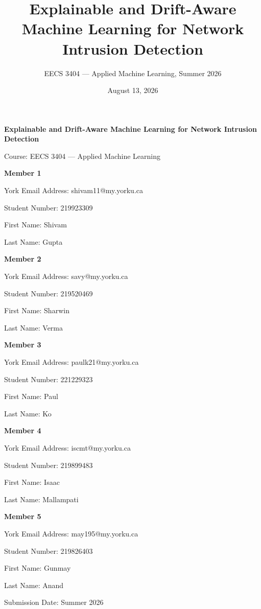 \documentclass[
  canadian,
  12pt,
]{article}
\title{Explainable and Drift-Aware Machine Learning for Network
Intrusion Detection}
\subtitle{EECS 3404 --- Applied Machine Learning, Summer 2026}
\author{}
\date{August 13, 2026}
\newif\ifshowtemplatecover \showtemplatecoverfalse
\begin{document}
\maketitle


\ifshowtemplatecover
\thispagestyle{empty}
\begingroup
\raggedright
\setlength{\parindent}{0pt}
\setlength{\parskip}{0pt}

\vspace*{2em}
{\large\bfseries Explainable and Drift-Aware Machine Learning for Network Intrusion Detection\par}
\vspace{1.5em}
Course: EECS 3404 --- Applied Machine Learning\par
\vspace{1.5em}
\textbf{Member 1}\par
York Email Address: shivam11@my.yorku.ca\par
Student Number: 219923309\par
First Name: Shivam\par
Last Name: Gupta\par
\vspace{0.8em}
\textbf{Member 2}\par
York Email Address: savy@my.yorku.ca\par
Student Number: 219520469\par
First Name: Sharwin\par
Last Name: Verma\par
\vspace{0.8em}
\textbf{Member 3}\par
York Email Address: paulk21@my.yorku.ca\par
Student Number: 221229323\par
First Name: Paul\par
Last Name: Ko\par
\vspace{0.8em}
\textbf{Member 4}\par
York Email Address: iscmt@my.yorku.ca\par
Student Number: 219899483\par
First Name: Isaac\par
Last Name: Mallampati\par
\vspace{0.8em}
\textbf{Member 5}\par
York Email Address: may195@my.yorku.ca\par
Student Number: 219826403\par
First Name: Gunmay\par
Last Name: Anand\par
\vspace{0.8em}
Submission Date: Summer 2026\par
\endgroup
\clearpage
\end{document}
